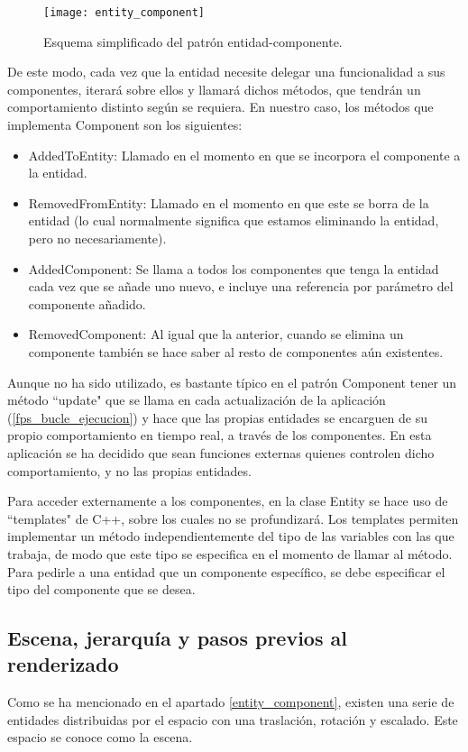 \begin{figure}[H]
    \centering
    \texttt{[image: entity\_component]}
    \caption{Esquema simplificado del patrón entidad-componente.}
    \label{fig:entity_component_structure}
\end{figure}

De este modo, cada vez que la entidad necesite delegar una funcionalidad a sus componentes, iterará sobre ellos y llamará dichos métodos, que tendrán un comportamiento distinto según se requiera. En nuestro caso, los métodos que implementa Component son los siguientes:

\begin{itemize}
    \item AddedToEntity: Llamado en el momento en que se incorpora el componente a la entidad.
    \item RemovedFromEntity: Llamado en el momento en que este se borra de la entidad (lo cual normalmente significa que estamos eliminando la entidad, pero no necesariamente).
    \item AddedComponent: Se llama a todos los componentes que tenga la entidad cada vez que se añade uno nuevo, e incluye una referencia por parámetro del componente añadido.
    \item RemovedComponent: Al igual que la anterior, cuando se elimina un componente también se hace saber al resto de componentes aún existentes.
\end{itemize}

Aunque no ha sido utilizado, es bastante típico en el patrón Component tener un método ``update" que se llama en cada actualización de la aplicación (\ref{fps_bucle_ejecucion}) y hace que las propias entidades se encarguen de su propio comportamiento en tiempo real, a través de los componentes. En esta aplicación se ha decidido que sean funciones externas quienes controlen dicho comportamiento, y no las propias entidades.

Para acceder externamente a los componentes, en la clase Entity se hace uso de ``templates" de C++, sobre los cuales no se profundizará. Los templates permiten implementar un método independientemente del tipo de las variables con las que trabaja, de modo que este tipo se especifica en el momento de llamar al método. Para pedirle a una entidad que un componente específico, se debe especificar el tipo del componente que se desea.

\subsection{Escena, jerarquía y pasos previos al renderizado}
\label{scene_hierarchy}
Como se ha mencionado en el apartado \ref{entity_component}, existen una serie de entidades distribuidas por el espacio con una traslación, rotación y escalado. Este espacio se conoce como la escena.

